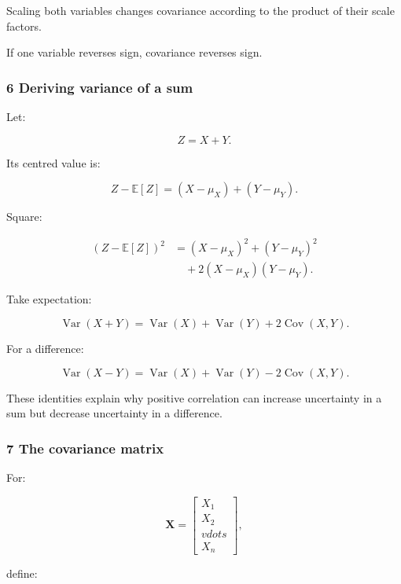 Scaling both variables changes covariance according to the product of their scale factors.

If one variable reverses sign, covariance reverses sign.

\subsubsection{6 Deriving variance of a sum}\label{02-foundations-ii-ch023-deriving-variance-of-a-sum}

\hypertarget{02-foundations-ii-ch023-deriving-variance-of-a-sum}{}

Let:

\[
 Z=X+Y.
\]

Its centred value is:

\[
 Z-\mathbb E[Z] = (X-\mu_X)+(Y-\mu_Y).
\]

Square:

\[
 \begin{aligned} (Z-\mathbb E[Z])^2 &=(X-\mu_X)^2+(Y-\mu_Y)^2\\ &\quad+2(X-\mu_X)(Y-\mu_Y). \end{aligned}
\]

Take expectation:

\[
 \boxed{ \operatorname{Var}(X+Y) = \operatorname{Var}(X)+ \operatorname{Var}(Y)+ 2\operatorname{Cov}(X,Y) }.
\]

For a difference:

\[
 \boxed{ \operatorname{Var}(X-Y) = \operatorname{Var}(X)+ \operatorname{Var}(Y)- 2\operatorname{Cov}(X,Y) }.
\]

These identities explain why positive correlation can increase uncertainty in a sum but decrease uncertainty in a difference.

\subsubsection{7 The covariance matrix}\label{02-foundations-ii-ch023-the-covariance-matrix}

\hypertarget{02-foundations-ii-ch023-the-covariance-matrix}{}

For:

\[
 \mathbf X= \begin{bmatrix}X_1\\X_2\\vdots\\X_n\end{bmatrix},
\]

define:

